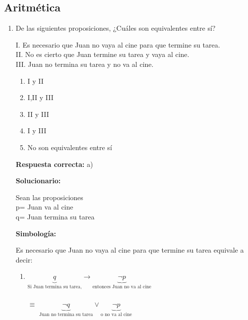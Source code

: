 \subsection*{Aritmética}
\begin{enumerate}

	\item De las siguientes proposiciones, ¿Cuáles son equivalentes entre sí?

	I. Es necesario que Juan no vaya al cine para que termine su tarea. \\
	II. No es cierto que Juan termine su tarea y vaya al cine.\\
	III. Juan no termina su tarea y no va al cine.\\

	\begin{enumerate}[label=\alph*)]
		\item I y II
		\item I,II y III
		\item II y III
		\item I y III
		\item No son equivalentes entre sí
	\end{enumerate}
	\textbf{Respuesta correcta:} a)

	\vspace{2mm}
	\textbf{Solucionario:}

	Sean las proposiciones\\
	p= Juan va al cine\\
	q= Juan termina su tarea\\

	\vspace{1mm}

	\textbf{Simbología:}

	\noindent \textbullet \quad Es necesario que Juan no vaya al cine para que termine su tarea equivale a decir:
	\vspace{0.2cm}



	\begin{enumerate}[label=\Roman*.] %
		\item \quad $\underbrace{q}_{\text{Si Juan termina su tarea,}} \to \underbrace{\neg p}_{\text{entonces Juan no va al cine}}$\\\\


		\quad $\equiv$ \quad $\underbrace{\neg q}_{\text{Juan no termina su tarea}} \lor \underbrace{\neg p}_{\text{o no va al cine}}$\\\\



\end{enumerate}
\end{enumerate}
